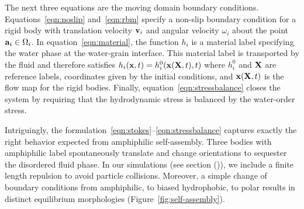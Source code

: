 The next three equations are the moving domain boundary conditions.
Equations~\eqref{eqn:noslip} and~\eqref{eqn:rbm} specify a non-slip
boundary condition for a rigid body with translation velocity $\vv_i$
and angular velocity $\omega_i$ about the point $\aa_i \in \Omega_i$. In
equation~\eqref{eqn:material}, the function $h_i$ is a material label
specifying the water phase at the water-grain interface. This material
label is transported by the fluid and therefore satisfies $h_i(\xx,t) =
h^0_i(\xx(\XX,t),t)$ where $h_i^0$ and $\XX$ are reference labels,
coordinates given by the initial conditions, and $\xx(\XX,t)$ is the
flow map for the rigid bodies. Finally,
equation~\eqref{eqn:stressbalance} closes the system by requiring that
the hydrodynamic stress is balanced by the water-order stress.

Intriguingly, the
formulation~\eqref{eqn:stokes}--\eqref{eqn:stressbalance} captures
exactly the right behavior expected from amphiphilic self-assembly.
Three bodies with amphiphilic label spontaneously translate and change
orientations to sequester the disordered fluid phase. In our simulations
(see section ()), we include a finite length repulsion to avoid particle
collisions. Moreover, a simple change of boundary conditions from
amphiphilic, to biased hydrophobic, to polar results in distinct
equilibrium morphologies (Figure~\ref{fig:self-assembly}).

